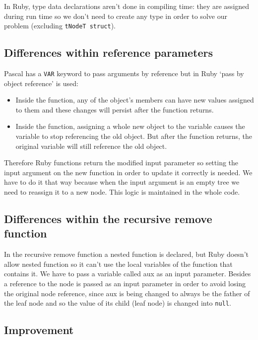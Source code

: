 \documentclass[11pt]{scrartcl} %
\begin{document}
In Ruby, type data declarations aren't done in compiling time: they are assigned during run time so we don't need to create any type in order to solve our problem (excluding \texttt{tNodeT struct}).

\subsection*{Differences within reference parameters}

Pascal has a \texttt{VAR} keyword to pass arguments by reference but in Ruby `pass by object reference' is used:

 \begin{itemize}
\item Inside the function, any of the object's members can have new values assigned to them and these changes will persist after the function returns.
\item Inside the function, assigning a whole new object to the variable causes the variable to stop referencing the old object. But after the function returns, the original variable will still reference the old object.
\end{itemize}

	Therefore Ruby functions return the modified input parameter so setting the input argument on the new function in order to update it correctly is needed.
	We have to do it that way because when the input argument is an empty tree we need to reassign it to a new node. This logic is maintained in the whole code.
	
\subsection*{Differences within the recursive remove function}

In the recursive remove function a nested function is declared, but Ruby doesn't allow nested function so it can't use the local variables of the function that contains it. We have to pass a variable called aux as an input parameter. Besides a reference to the node is passed as an input parameter in order to avoid losing the original node reference, since aux is being changed to always be the father of the leaf node and so the value of its child (leaf node) is changed into \texttt{null}.
 
\subsection*{Improvement}
\end{document}
